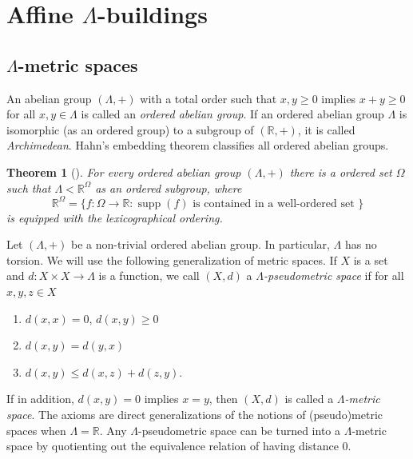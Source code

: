 \documentclass[12pt]{amsart}
\newcommand{\R}{\mathbb{R} }
\numberwithin{equation}{section}
\newtheorem{theorem}{Theorem}[section]
\theoremstyle{remark} %
\begin{document}
\begingroup
	\setlength{\parskip}{1.5pt} %
	\tableofcontents
\endgroup


		
	 
	\section{Affine \texorpdfstring{$\Lambda$}{Λ}-buildings}\label{sec:affine_L_buildings} 
	
	
	\subsection{\texorpdfstring{$\Lambda$}{Λ}-metric spaces}
	
	An abelian group $(\Lambda, +)$ with a total order such that $x,y \geq 0$ implies $x+y \geq 0$ for all $x,y \in \Lambda$ is called an \emph{ordered abelian group}. If an ordered abelian group $\Lambda$ is isomorphic (as an ordered group) to a subgroup of $(\R,+)$, it is called \emph{Archimedean}. Hahn's embedding theorem classifies all ordered abelian groups.
	
	\begin{theorem}[\cite{Hah07}] For every ordered abelian group $(\Lambda,+)$ there is a ordered set $\Omega$ such that $\Lambda<\R^{\Omega}$ as an ordered subgroup, where 
		$$
		\R^\Omega = \{ f\colon \Omega \to \R \colon \operatorname{supp}(f) \text{ is contained in a well-ordered set } \}
		$$
		is equipped with the lexicographical ordering.  
	\end{theorem} 
	Let $(\Lambda,+)$ be a non-trivial ordered abelian group. In particular, $\Lambda$ has no torsion. 
	We will use the following generalization of metric spaces.
	If $X$ is a set and $d \colon X \times X \to \Lambda$ is a function, we call $(X,d)$ a \emph{$\Lambda$-pseudometric space} if for all $x,y,z \in X$
	\begin{enumerate}
		\item [(1)] $d(x,x) = 0$, $d(x,y) \geq 0$
		\item [(2)] $d(x,y) = d(y,x)$
		\item [(3)] $d(x,y) \leq d(x,z) + d(z,y)$. 
	\end{enumerate}
	If in addition, $d(x,y) = 0$ implies $x=y$, then $(X,d)$ is called a \emph{$\Lambda$-metric space}. The axioms are direct generalizations of the notions of (pseudo)metric spaces when $\Lambda = \R$. Any $\Lambda$-pseudometric space can be turned into a $\Lambda$-metric space by quotienting out the equivalence relation of having distance $0$.
	
\end{document}
